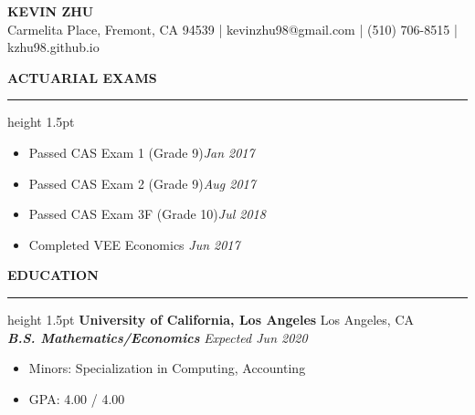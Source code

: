 \documentclass[11pt,letterpaper]{article}
\newcommand{\sectline}{\vspace{3pt}\hrule height 1.5pt\vspace{3pt}}
\newcommand{\sectspace}{\vspace{8pt}}
\begin{document}
\centering
{\fontsize{13pt}{13pt}\selectfont \textbf{KEVIN ZHU}} \vspace{2pt} \\
{\fontsize{11pt}{13pt} Carmelita Place, Fremont, CA 94539 | kevinzhu98@gmail.com | (510) 706-8515 | kzhu98.github.io}
\sectspace

\fontsize{11pt}{13pt}\selectfont
\raggedright
\textbf{ACTUARIAL EXAMS}\sectline
\begin{itemize}
	\item Passed CAS Exam 1 (Grade 9)\hfill \textit{Jan 2017}
	\item Passed CAS Exam 2 (Grade 9)\hfill \textit{Aug 2017}
	\item Passed CAS Exam 3F (Grade 10)\hfill \textit{Jul 2018}
	\item Completed VEE Economics \hfill \textit{Jun 2017}
\end{itemize}
\sectspace


\textbf{EDUCATION}\sectline
\textbf{University of California, Los Angeles} \hfill Los Angeles, CA \\
\textbf{\textit{B.S. Mathematics/Economics}} \hfill \textit{Expected Jun 2020}
\begin{itemize}
	\item Minors: Specialization in Computing, Accounting
	\item GPA: 4.00 / 4.00
\end{itemize}
\sectspace
\end{document}
